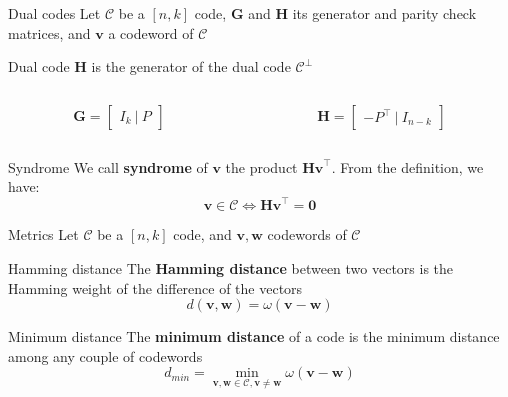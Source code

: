 \begin{frame}{Dual codes}
    Let $\mathcal{C}$ be a $[n, k]$ code, $\mathbf{G}$ and $\mathbf{H}$ its generator and parity check matrices, and $\mathbf{v}$ a codeword of $\mathcal{C}$
        \begin{block}{Dual code}
            $\mathbf{H}$ is the generator of the dual code $\mathcal{C}^\bot$
            \begin{columns}
                \begin{column}{0.45\linewidth}
                    \begin{equation*}
                        \mathbf{G} = \begin{bmatrix} I_k ~|~ P \end{bmatrix}
                    \end{equation*}
                \end{column}
                \begin{column}{0.45\linewidth}
                    \begin{equation*}
                        \mathbf{H} = \begin{bmatrix} -P^\top ~|~ I_{n-k} \end{bmatrix}
                    \end{equation*}
                \end{column}
            \end{columns}
        \end{block}
        \begin{block}{Syndrome}
            We call \textbf{syndrome} of $\mathbf{v}$ the product $\mathbf{Hv}^\top$. From the definition, we have:
            \begin{equation*}
                \mathbf{v} \in \mathcal{C} \Leftrightarrow \mathbf{Hv}^\top = \mathbf{0}
            \end{equation*}
        \end{block}
\end{frame}

\begin{frame}{Metrics}
    Let $\mathcal{C}$ be a $[n, k]$ code, and $\mathbf{v, w}$ codewords of $\mathcal{C}$
    \begin{block}{Hamming distance}
        The \textbf{Hamming distance} between two vectors is the Hamming weight of the difference of the vectors
        \begin{equation*}
            d(\mathbf{v, w}) = \omega(\mathbf{v - w})
        \end{equation*}
    \end{block}
    \begin{block}{Minimum distance}
        The \textbf{minimum distance} of a code is the minimum distance among any couple of codewords
        \begin{equation*}
            d_{min} = \min_{\mathbf{v, w} \in \mathcal{C}, \mathbf{v \neq w}} \omega(\mathbf{v-w})
        \end{equation*}
    \end{block}
\end{frame}

